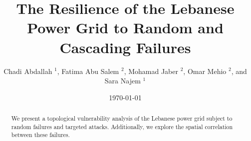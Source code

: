 \documentclass[twocolumn,showpacs,preprintnumbers,amsmath,amssymb,floatfix]{revtex4-1}
\begin{document}
\author{Chadi Abdallah $^{1}$, Fatima Abu Salem $^{2}$, Mohamad  Jaber $^{2}$, Omar Mehio $^{2}$, and Sara Najem $^{1}$}


\date{\today}


\begin{abstract}
We present a topological vulnerability analysis of the Lebanese power grid subject to random failures and targeted attacks. Additionally, we explore the spatial correlation between these failures. 
 \end{abstract}
 
 
\title{The Resilience of the Lebanese Power Grid to Random and Cascading Failures}

\maketitle








\end{document}
